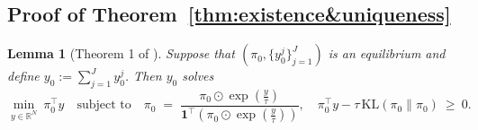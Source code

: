 \documentclass{article}
\newtheorem{lemma}{Lemma}
\begin{document}
\subsection{Proof of Theorem~\ref{thm:existence&uniqueness}}\label{proof:existence&uniqueness}
\begin{lemma}[Theorem 1 of \citep{bernheim1986common}]
\label{lemma:minimal cost}
Suppose that $(\pi_0,\{y_0^j\}_{j=1}^J)$ is an equilibrium and define
$y_0 := \sum_{j=1}^J y_0^j$.
Then $y_0$ solves
\[
\min_{y\in\mathbb{R}^N}\ \pi_0^\top y
\quad\text{subject to}\quad
\pi_0 \;=\; \frac{\pi_0\odot \exp\!\left(\tfrac{y}{\tau}\right)}
{\mathbf{1}^\top\!\left(\pi_0\odot \exp\!\left(\tfrac{y}{\tau}\right)\right)},
\quad
\pi_0^\top y-\tau\,\mathrm{KL}(\pi_0\|\pi_0)\ \ge\ 0.
\]
\end{lemma}
\end{document}
